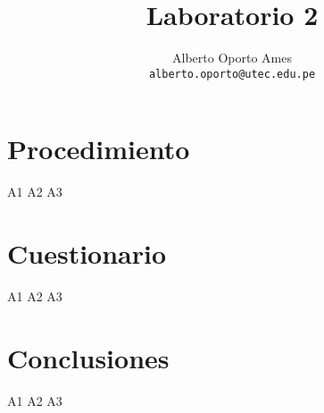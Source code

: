 \documentclass[12pt]{article}
\title{\textbf{Laboratorio 2}}
\author{
		Alberto Oporto Ames\\
		\texttt{alberto.oporto@utec.edu.pe}\\
		}
\begin{document}
\maketitle
\thispagestyle{fancy}

\section{Procedimiento}%
\label{sec:procedimiento}

{A1}
{A2}
{A3}

\section{Cuestionario}%
\label{sec:cuestionario}

{A1}
{A2}
{A3}

\section{Conclusiones}%
\label{sec:conclusiones}

{A1}
{A2}
{A3}
\end{document}
